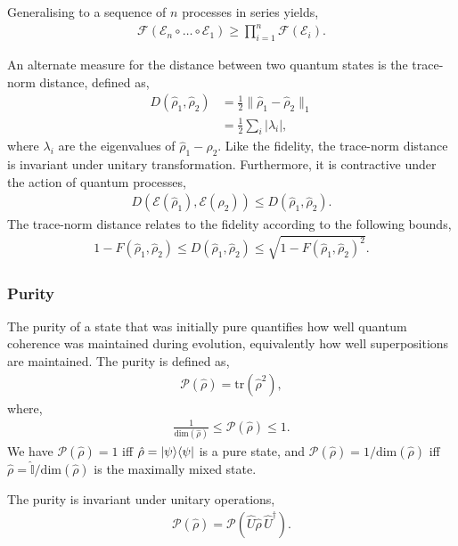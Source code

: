 Generalising to a sequence of $n$ processes in series yields,
\begin{align}
\mathcal{F}(\mathcal{E}_n\circ\dots\circ\mathcal{E}_1) \geq \prod_{i=1}^n \mathcal{F}(\mathcal{E}_i).
\end{align}

An alternate measure for the distance between two quantum states is the trace-norm distance, defined as,
\begin{align}
D(\hat\rho_1,\hat\rho_2) &= \frac{1}{2}\|\hat\rho_1 - \hat\rho_2\|_1 \nonumber\\
&= \frac{1}{2}\sum_i |\lambda_i|,
\end{align}
where $\lambda_i$ are the eigenvalues of \mbox{$\hat\rho_1-\hat\rho_2$}. Like the fidelity, the trace-norm distance is invariant under unitary transformation. Furthermore, it is contractive under the action of quantum processes,
\begin{align}
D(\mathcal{E}(\hat\rho_1),\mathcal{E}(\hat\rho_2)) \leq D(\hat\rho_1,\hat\rho_2).
\end{align}
The trace-norm distance relates to the fidelity according to the following bounds,
\begin{align}
1-F(\hat\rho_1,\hat\rho_2) \leq D(\hat\rho_1,\hat\rho_2) \leq \sqrt{1-F(\hat\rho_1,\hat\rho_2)^2}.
\end{align}

%
%

\subsubsection{Purity} 

The purity of a state that was initially pure quantifies how well quantum coherence was maintained during evolution, equivalently how well superpositions are maintained. The purity is defined as,
\begin{align}
\mathcal{P}(\hat\rho) = \mathrm{tr}(\hat\rho^2),
\end{align}
where,
\begin{align}
\frac{1}{\mathrm{dim}(\hat\rho)} \leq \mathcal{P}(\hat\rho) \leq 1.
\end{align}
We have \mbox{$\mathcal{P}(\hat\rho) = 1$} iff \mbox{$\hat\rho=|\psi\rangle\langle\psi|$} is a pure state, and \mbox{$\mathcal{P}(\hat\rho)=1/\mathrm{dim}(\hat\rho)$} iff \mbox{$\hat\rho=\mathbb{\hat{I}}/\mathrm{dim}(\hat\rho)$} is the maximally mixed state.

The purity is invariant under unitary operations,
\begin{align}
\mathcal{P}(\hat\rho) = \mathcal{P}(\hat{U}\hat\rho\,\hat{U}^\dag).
\end{align}

